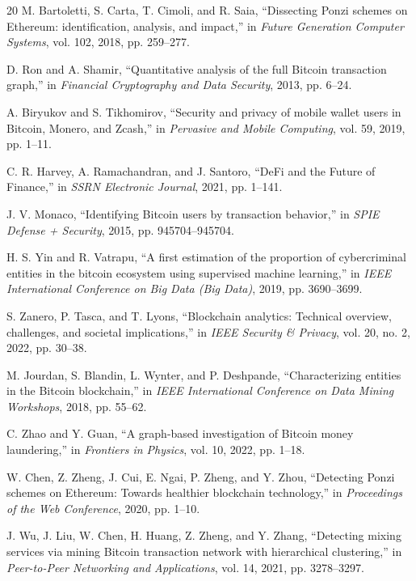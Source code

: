 \documentclass[conference]{IEEEtran}
\begin{document}
\begin{thebibliography}{20}
M. Bartoletti, S. Carta, T. Cimoli, and R. Saia, ``Dissecting Ponzi schemes on Ethereum: identification, analysis, and impact,'' in \emph{Future Generation Computer Systems}, vol. 102, 2018, pp. 259--277.

D. Ron and A. Shamir, ``Quantitative analysis of the full Bitcoin transaction graph,'' in \emph{Financial Cryptography and Data Security}, 2013, pp. 6--24.

A. Biryukov and S. Tikhomirov, ``Security and privacy of mobile wallet users in Bitcoin, Monero, and Zcash,'' in \emph{Pervasive and Mobile Computing}, vol. 59, 2019, pp. 1--11.

C. R. Harvey, A. Ramachandran, and J. Santoro, ``DeFi and the Future of Finance,'' in \emph{SSRN Electronic Journal}, 2021, pp. 1--141.

J. V. Monaco, ``Identifying Bitcoin users by transaction behavior,'' in \emph{SPIE Defense + Security}, 2015, pp. 945704--945704.

H. S. Yin and R. Vatrapu, ``A first estimation of the proportion of cybercriminal entities in the bitcoin ecosystem using supervised machine learning,'' in \emph{IEEE International Conference on Big Data (Big Data)}, 2019, pp. 3690--3699.

S. Zanero, P. Tasca, and T. Lyons, ``Blockchain analytics: Technical overview, challenges, and societal implications,'' in \emph{IEEE Security \& Privacy}, vol. 20, no. 2, 2022, pp. 30--38.

M. Jourdan, S. Blandin, L. Wynter, and P. Deshpande, ``Characterizing entities in the Bitcoin blockchain,'' in \emph{IEEE International Conference on Data Mining Workshops}, 2018, pp. 55--62.

C. Zhao and Y. Guan, ``A graph-based investigation of Bitcoin money laundering,'' in \emph{Frontiers in Physics}, vol. 10, 2022, pp. 1--18.

W. Chen, Z. Zheng, J. Cui, E. Ngai, P. Zheng, and Y. Zhou, ``Detecting Ponzi schemes on Ethereum: Towards healthier blockchain technology,'' in \emph{Proceedings of the Web Conference}, 2020, pp. 1--10.

J. Wu, J. Liu, W. Chen, H. Huang, Z. Zheng, and Y. Zhang, ``Detecting mixing services via mining Bitcoin transaction network with hierarchical clustering,'' in \emph{Peer-to-Peer Networking and Applications}, vol. 14, 2021, pp. 3278--3297.


\end{thebibliography}
\end{document}
